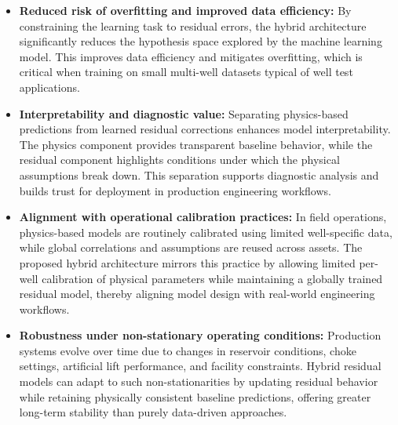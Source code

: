 \documentclass[12pt,APA]{uomthesis}
\begin{document}
\begin{itemize}
    \item \textbf{Reduced risk of overfitting and improved data efficiency:}  
    By constraining the learning task to residual errors, the hybrid architecture significantly reduces the hypothesis space explored by the machine learning model. 
    This improves data efficiency and mitigates overfitting, which is critical when training on small multi-well datasets typical of well test applications.

    \item \textbf{Interpretability and diagnostic value:}  
    Separating physics-based predictions from learned residual corrections enhances model interpretability. 
    The physics component provides transparent baseline behavior, while the residual component highlights conditions under which the physical assumptions break down. 
    This separation supports diagnostic analysis and builds trust for deployment in production engineering workflows.

    \item \textbf{Alignment with operational calibration practices:}  
    In field operations, physics-based models are routinely calibrated using limited well-specific data, while global correlations and assumptions are reused across assets. 
    The proposed hybrid architecture mirrors this practice by allowing limited per-well calibration of physical parameters while maintaining a globally trained residual model, thereby aligning model design with real-world engineering workflows.

    \item \textbf{Robustness under non-stationary operating conditions:}  
    Production systems evolve over time due to changes in reservoir conditions, choke settings, artificial lift performance, and facility constraints. 
    Hybrid residual models can adapt to such non-stationarities by updating residual behavior while retaining physically consistent baseline predictions, offering greater long-term stability than purely data-driven approaches.
\end{itemize}
\end{document}
